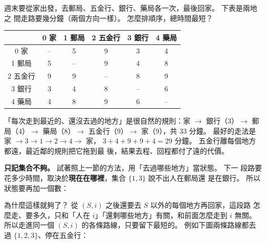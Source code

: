 週末要從家出發，去郵局、五金行、銀行、藥局各一次，最後回家。 下表是兩地之
間走路要幾分鐘（兩個方向一樣）。 怎麼排順序，總時間最短？

\begin{center}
\begin{tabular}{c|ccccc}
\toprule
 & 0 家 & 1 郵局 & 2 五金行 & 3 銀行 & 4 藥局 \\
\midrule
0 家 & -- & 5 & 9 & 3 & 4 \\
1 郵局 & 5 & -- & 9 & 4 & 8 \\
2 五金行 & 9 & 9 & -- & 8 & 9 \\
3 銀行 & 3 & 4 & 8 & -- & 6 \\
4 藥局 & 4 & 8 & 9 & 6 & -- \\
\bottomrule
\end{tabular}
\end{center}

「每次走到最近的、還沒去過的地方」是很自然的規則：家 $\to$ 銀行（$3$）$\to$
郵局（$4$）$\to$ 藥局（$8$）$\to$ 五金行（$9$）$\to$ 家（$9$），共 $33$ 分鐘。
最好的走法是家 $\to 3 \to 1 \to 2 \to 4 \to$ 家，
$3 + 4 + 9 + 9 + 4 = 29$ 分鐘。 五金行離每個地方都遠，最近鄰的規則把它拖到最
後，結果去程、回程都付了遠的代價。

\textbf{只記集合不夠。} 試著照上一節的方法，用「去過哪些地方」當狀態。 下一
段路要花多少時間，取決於\textbf{現在在哪裡}，集合 $\{1, 3\}$ 說不出人在郵局還
是在銀行。 所以狀態要再加一個數：

\begin{center}
\end{center}

為什麼這樣就夠了？ 從 $(S, i)$ 之後還要去 $S$ 以外的每個地方再回家，這段路
怎麼走、要多久，只和「人在 $i$」「還剩哪些地方」有關，和前面怎麼走到 $i$ 無關。
所以走進同一個 $(S, i)$ 的各條路線，只要留下最短的。 例如下圖兩條路線都去過
$\{1, 2, 3\}$、停在五金行：

